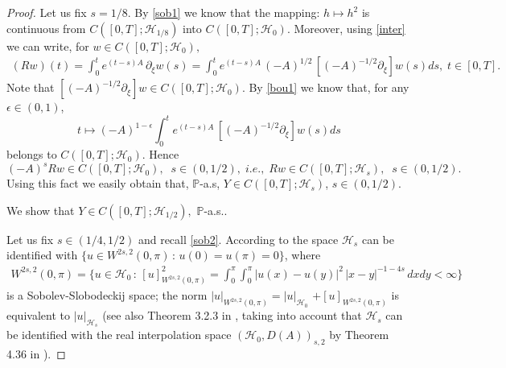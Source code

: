 \documentclass[preprint]{imsart}
\def\P{\mathbb P}
\begin{document}
\begin{proof}
 Let us fix $s = 1/8$.  By \eqref{sob1} we know that the mapping: $ h \mapsto h^2$ is continuous from $C([0,T]; {\mathcal H}_{1/8})$ into $C([0,T]; {\mathcal H}_0)$. Moreover, using \eqref{inter} we can write, for $w \in C([0,T]; {\mathcal H}_0), $
\begin{gather*}
(Rw)(t) = \int_{0}^{t} e^{(  t-s)  A} \, \partial_{\xi}  
w(s) = \int_{0}^{t} e^{(  t-s)  A} \, (-A)^{1/2}  \, [(-A)^{-1/2} \partial_{\xi}]  
w(s) 
ds, \; t \in [0,T]. 
\end{gather*}
Note that    $[(-A)^{-1/2} \partial_{\xi}]  
w  \in C([0,T]; {\mathcal H}_0)$.  
 By \eqref{bou1} we know that, for any $\epsilon \in (0,1)$,  
 $$ t \mapsto (-A)^{1- \epsilon}\int_{0}^{t} e^{(  t-s)  A}  \, [(-A)^{-1/2} \partial_{\xi}]  
w(s)  ds$$ belongs to $C([0,T]; {\mathcal H}_0)$. Hence 
$$
(-A)^{s} Rw \in C([0,T]; {\mathcal H}_0),\;\; s \in (0, 1/2),\; i.e.,\;  
Rw \in C([0,T]; {\mathcal H}_s), \;\; s \in (0, 1/2).
$$ 
  Using this fact we easily  obtain  that,
  $ \P$-a.s,  $Y \in C([0,T]; {\mathcal H}_{s})$, $s \in (0,1/2)$.
 
\vskip 1mm 

  We show that $Y \in C([0,T]; {\mathcal H}_{1/2}),  $ $\P$-a.s..  
 
\vskip 1mm 
 Let us fix $s \in (1/4, 1/2)$ and  recall \eqref{sob2}. According to \cite{grisvard} the space  ${\mathcal H}_s$ can be identified with $\{ u \in W^{2s,2}(0, \pi) \, :\,  
 u(0)=u(\pi)=0\}$, where 
\begin{equation*}\label{gris}
 \begin{array}{l}
W^{2s,2}(0, \pi) = \big \{ u \in {\mathcal H}_0 \, :\, [u]_{W^{2s,2}(0, \pi)}^2 
= \int_{0}^{\pi}  \int_{0}^{\pi}  |u(x) - u(y)|^2 \, |x-y|^{-1 - 4s} \, dx dy < \infty  \big \}
\end{array} 
\end{equation*}
 is  
 a Sobolev-Slobodeckij  space; the norm $|u|_{W^{2s,2}(0, \pi)} = |u|_{{\mathcal H}_0} $ $+ [u]_{W^{2s,2}(0, \pi)}$  is equivalent to $|u|_{{\mathcal H}_s}$
 (see also Theorem 3.2.3 in \cite{analityc}, taking into account that 
 ${\mathcal H}_s $ can be identified with the real interpolation space $({\mathcal H}_0, D(A) )_{s,2} $     by Theorem 4.36 in \cite{interpola}). 
 

\end{proof}
\end{document}
